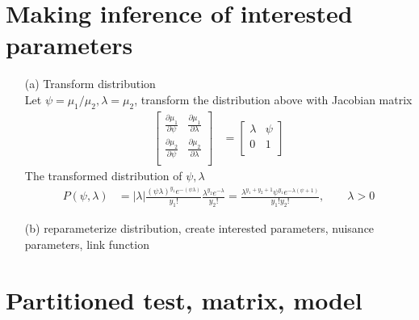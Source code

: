 \section{Making inference of interested parameters}
\begin{itemize}
    \item [(a)] Transform distribution\\
    Let $\psi = \mu_1/\mu_2, \lambda = \mu_2$, transform the distribution above with Jacobian matrix
\begin{align*}
\begin{bmatrix}
            \frac{\partial \mu_1}{\partial \psi} & \frac{\partial \mu_1}{\partial \lambda}\\
           \frac{\partial \mu_2}{\partial \psi} & \frac{\partial \mu_2}{\partial \lambda}\\
         \end{bmatrix} &= \begin{bmatrix}
            \lambda & \psi\\
            0 & 1\\
         \end{bmatrix}
\end{align*}
The transformed distribution of $\psi, \lambda$
\begin{align*}
P(\psi, \lambda) &= |\lambda| \frac{(\psi \lambda)^{y_1} e^{-(\psi \lambda)}}{y_1!} \frac{\lambda^{y_2} e^{-\lambda}}{y_2!} = \frac{\lambda^{y_1+y_2+1} \psi^{y_1} e^{-\lambda(\psi+1)}}{y_1!y_2!}, \qquad \lambda > 0
\end{align*}
\item[(b)] reparameterize distribution, create interested parameters, nuisance parameters, link function\\

\end{itemize}

\section{Partitioned test, matrix, model}




